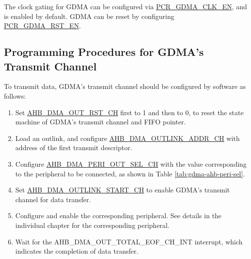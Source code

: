 \documentclass[main\_\_EN.tex]{subfiles}
\begin{document}
The clock gating for GDMA can be configured via \hyperref[fielddesc:PCRGDMACLKEN]{PCR\_GDMA\_CLK\_EN}, and is enabled by default. GDMA can be reset by configuring \hyperref[fielddesc:PCRGDMARSTEN]{PCR\_GDMA\_RST\_EN}.

\subsection{Programming Procedures for GDMA's Transmit Channel}

To transmit data, GDMA's transmit channel should be configured by software as follows:
\begin{enumerate}
    \item Set \hyperref[fielddesc:AHBDMAOUTRSTCHN]{AHB\_DMA\_OUT\_RST\_CH} first to 1 and then to 0, to reset the state machine of GDMA's transmit channel and FIFO pointer.
    \item Load an outlink, and configure \hyperref[fielddesc:AHBDMAOUTLINKADDRCHN]{AHB\_DMA\_OUTLINK\_ADDR\_CH}  with address of the first transmit descriptor.
    \item Configure \hyperref[fielddesc:AHBDMAPERIOUTSELCHN]{AHB\_DMA\_PERI\_OUT\_SEL\_CH} with the value corresponding to the peripheral to be connected, as shown in Table \ref{tab:gdma-ahb-peri-sel}.
    \item Set \hyperref[fielddesc:AHBDMAOUTLINKSTARTCHN]{AHB\_DMA\_OUTLINK\_START\_CH} to enable GDMA's transmit channel for data transfer.
    \item Configure and enable the corresponding peripheral. See details in the individual chapter for the corresponding peripheral.
    \item Wait for the AHB\_DMA\_OUT\_TOTAL\_EOF\_CH\_INT interrupt, which indicates the completion of data transfer.
\end{enumerate}
\end{document}
